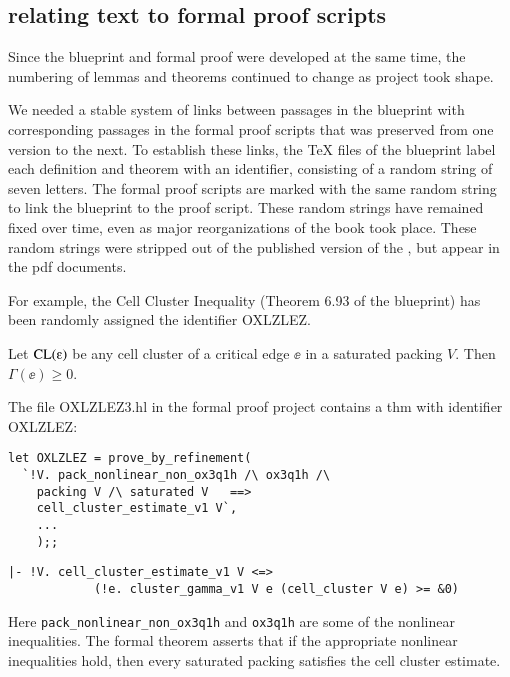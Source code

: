 \subsection{relating text to formal proof scripts}\label{sec:rt}

Since the blueprint and formal proof were developed at the same time, the 
numbering of lemmas and theorems continued to change as project 
took shape.

We needed a stable system of links between passages in the blueprint
with corresponding passages in the formal proof scripts that was
preserved from one version to the next.  To establish these links, the
TeX files of the blueprint label each definition and theorem with an
identifier, consisting of a random string of seven letters.  The
formal proof scripts are marked with the same random string to link
the blueprint to the proof script.  These random strings have remained
fixed over time, even as major reorganizations of the book took place.
These random strings were stripped out of the published version of the
\cite{DCG}, but appear in the pdf documents.

For example, the Cell Cluster Inequality (Theorem 6.93 of the
blueprint) has been randomly assigned the identifier OXLZLEZ.


\begin{theorem*} 
\label{lemma:cluster}
Let $\op{CL}(\ee)$ be any cell cluster of a critical edge $\ee$ in a
saturated packing $V$.  Then $\Gamma(\ee)\ge 0$.
\end{theorem*}


The file OXLZLEZ3.hl in the formal proof project contains a thm with identifier
OXLZLEZ:

\begin{verbatim}
let OXLZLEZ = prove_by_refinement(
  `!V. pack_nonlinear_non_ox3q1h /\ ox3q1h /\ 
    packing V /\ saturated V   ==>
    cell_cluster_estimate_v1 V`,
    ...
    );;
\end{verbatim}


\begin{verbatim}
|- !V. cell_cluster_estimate_v1 V <=>
            (!e. cluster_gamma_v1 V e (cell_cluster V e) >= &0)
\end{verbatim}

Here \verb!pack_nonlinear_non_ox3q1h! and \verb!ox3q1h! are some of the
nonlinear inequalities.   The formal theorem asserts that if the appropriate nonlinear inequalities
hold, then every saturated packing satisfies the cell cluster estimate.

